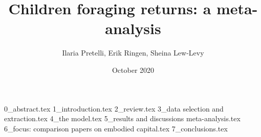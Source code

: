 \documentclass{article}
\title{Children foraging returns: a meta-analysis}
\author{Ilaria Pretelli, Erik Ringen, Sheina Lew-Levy}
\date{October 2020}
\begin{document}
\maketitle
\linenumbers


{0_abstract.tex}
{1_introduction.tex}
{2_review.tex}
{3_data selection and extraction.tex}
{4_the model.tex}
{5_results and discussions meta-analysis.tex}
{6_focus: comparison papers on embodied capital.tex}
{7_conclusions.tex}




\end{document}
